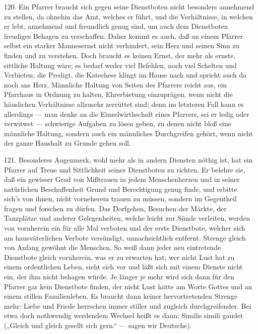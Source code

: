 120. Ein Pfarrer braucht sich gegen seine Dienstboten nicht besonders annehmend zu stellen, da ohnehin das Amt, welches er führt, und die Verhältnisse, in welchen er lebt, annehmend und freundlich genug sind, um auch dem Dienstboten freudiges Behagen zu verschaffen. Daher kommt es auch, daß an einem Pfarrer selbst ein starker Mannesernst nicht verhindert, sein Herz und seinen Sinn zu finden und zu verstehen. Doch braucht es keinen Ernst, der mehr als ernste, sittliche Haltung wäre; es bedarf weder viel Befehlen, noch viel Schelten und Verbieten; die Predigt, die Katechese klingt im Hause nach und spricht auch da noch ans Herz. Männliche Haltung von Seiten des Pfarrers reicht aus, ein Pfarrhaus in Ordnung zu halten, Ehrerbietung einzuprägen, wenn nicht die häuslichen Verhältnisse allzusehr zerrüttet sind; denn im letzteren Fall kann es allerdings — man denke an die Einzelwirthschaft eines Pfarrers, sei er ledig oder verwitwet — schwierige Aufgaben zu lösen geben, zu denen nicht bloß eine männliche Haltung, sondern auch ein männliches Durchgreifen gehört, wenn nicht der ganze Haushalt zu Grunde gehen soll.

121. Besonderes Augenmerk, wohl mehr als in andern Diensten nöthig ist, hat ein Pfarrer auf Treue und Sittlichkeit seiner Dienstboten zu richten. Er belehre sie, daß ein gewisser Grad von Mißtrauen in jedem Menschenherzen und in seiner natürlichen Beschaffenheit Grund und Berechtigung genug finde, und erbitte sich’s von ihnen, nicht vorneherein trauen zu müssen, sondern im Gegentheil fragen und forschen zu dürfen. Das Dorfgehen, Besuchen der Märkte, der Tanzplätze und anderer
Gelegenheiten, welche leicht zur Sünde verleiten, werden von vornherein ein für alle Mal verboten und der erste Dienstbote, welcher sich am hausväterlichen Verbote versündigt, unnachsichtlich entfernt. Strenge gleich von Anfang gewöhnt die Menschen. So weiß dann jeder neu eintretende Dienstbote gleich vornherein, was er zu erwarten hat; wer nicht Lust hat zu einem ordentlichen Leben, sieht sich vor und läßt sich mit einem Dienste nicht ein, der ihm nicht behagen würde. Je länger je mehr wird sich dann für den Pfarrer gar kein Dienstbote finden, der nicht Lust hätte am Worte Gottes und an einem stillen Familienleben. Es braucht dann keiner hervortretenden Strenge mehr: Liebe und Friede herrschen immer stiller und zugleich durchgreifender. Bei etwa doch nothwendig werdendem Wechsel heißt es dann: Similis simili gaudet („Gleich und gleich gesellt sich gern.“ — sagen wir Deutsche).

